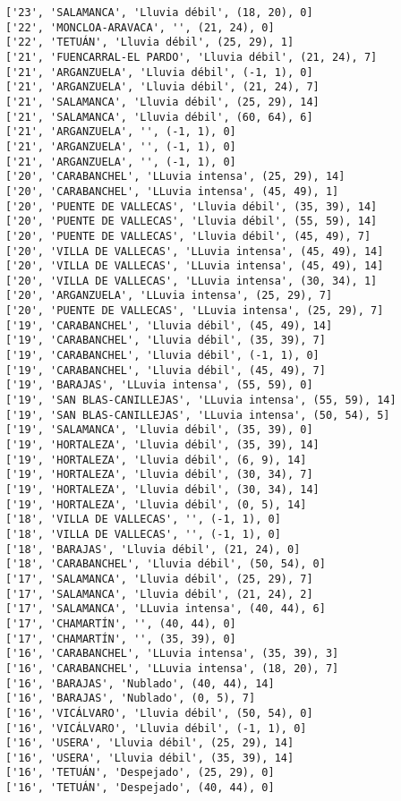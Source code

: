 \documentclass[11pt]{article}
\begin{document}
\begin{Verbatim}[commandchars=\\\{\}]
['23', 'SALAMANCA', 'Lluvia débil', (18, 20), 0]
['22', 'MONCLOA-ARAVACA', '', (21, 24), 0]
['22', 'TETUÁN', 'Lluvia débil', (25, 29), 1]
['21', 'FUENCARRAL-EL PARDO', 'Lluvia débil', (21, 24), 7]
['21', 'ARGANZUELA', 'Lluvia débil', (-1, 1), 0]
['21', 'ARGANZUELA', 'Lluvia débil', (21, 24), 7]
['21', 'SALAMANCA', 'Lluvia débil', (25, 29), 14]
['21', 'SALAMANCA', 'Lluvia débil', (60, 64), 6]
['21', 'ARGANZUELA', '', (-1, 1), 0]
['21', 'ARGANZUELA', '', (-1, 1), 0]
['21', 'ARGANZUELA', '', (-1, 1), 0]
['20', 'CARABANCHEL', 'LLuvia intensa', (25, 29), 14]
['20', 'CARABANCHEL', 'LLuvia intensa', (45, 49), 1]
['20', 'PUENTE DE VALLECAS', 'Lluvia débil', (35, 39), 14]
['20', 'PUENTE DE VALLECAS', 'Lluvia débil', (55, 59), 14]
['20', 'PUENTE DE VALLECAS', 'Lluvia débil', (45, 49), 7]
['20', 'VILLA DE VALLECAS', 'LLuvia intensa', (45, 49), 14]
['20', 'VILLA DE VALLECAS', 'LLuvia intensa', (45, 49), 14]
['20', 'VILLA DE VALLECAS', 'LLuvia intensa', (30, 34), 1]
['20', 'ARGANZUELA', 'LLuvia intensa', (25, 29), 7]
['20', 'PUENTE DE VALLECAS', 'LLuvia intensa', (25, 29), 7]
['19', 'CARABANCHEL', 'Lluvia débil', (45, 49), 14]
['19', 'CARABANCHEL', 'Lluvia débil', (35, 39), 7]
['19', 'CARABANCHEL', 'Lluvia débil', (-1, 1), 0]
['19', 'CARABANCHEL', 'Lluvia débil', (45, 49), 7]
['19', 'BARAJAS', 'LLuvia intensa', (55, 59), 0]
['19', 'SAN BLAS-CANILLEJAS', 'LLuvia intensa', (55, 59), 14]
['19', 'SAN BLAS-CANILLEJAS', 'LLuvia intensa', (50, 54), 5]
['19', 'SALAMANCA', 'Lluvia débil', (35, 39), 0]
['19', 'HORTALEZA', 'Lluvia débil', (35, 39), 14]
['19', 'HORTALEZA', 'Lluvia débil', (6, 9), 14]
['19', 'HORTALEZA', 'Lluvia débil', (30, 34), 7]
['19', 'HORTALEZA', 'Lluvia débil', (30, 34), 14]
['19', 'HORTALEZA', 'Lluvia débil', (0, 5), 14]
['18', 'VILLA DE VALLECAS', '', (-1, 1), 0]
['18', 'VILLA DE VALLECAS', '', (-1, 1), 0]
['18', 'BARAJAS', 'Lluvia débil', (21, 24), 0]
['18', 'CARABANCHEL', 'Lluvia débil', (50, 54), 0]
['17', 'SALAMANCA', 'Lluvia débil', (25, 29), 7]
['17', 'SALAMANCA', 'Lluvia débil', (21, 24), 2]
['17', 'SALAMANCA', 'LLuvia intensa', (40, 44), 6]
['17', 'CHAMARTÍN', '', (40, 44), 0]
['17', 'CHAMARTÍN', '', (35, 39), 0]
['16', 'CARABANCHEL', 'LLuvia intensa', (35, 39), 3]
['16', 'CARABANCHEL', 'LLuvia intensa', (18, 20), 7]
['16', 'BARAJAS', 'Nublado', (40, 44), 14]
['16', 'BARAJAS', 'Nublado', (0, 5), 7]
['16', 'VICÁLVARO', 'Lluvia débil', (50, 54), 0]
['16', 'VICÁLVARO', 'Lluvia débil', (-1, 1), 0]
['16', 'USERA', 'Lluvia débil', (25, 29), 14]
['16', 'USERA', 'Lluvia débil', (35, 39), 14]
['16', 'TETUÁN', 'Despejado', (25, 29), 0]
['16', 'TETUÁN', 'Despejado', (40, 44), 0]

\end{Verbatim}
\end{document}
